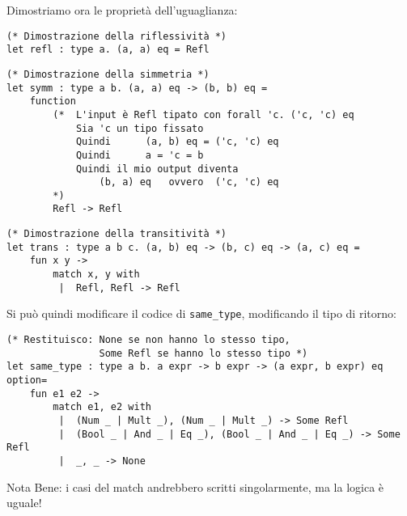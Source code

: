 \documentclass{article}
\begin{document}
Dimostriamo ora le proprietà dell'uguaglianza:
\begin{tcolorbox}
\begin{verbatim}
(* Dimostrazione della riflessività *)
let refl : type a. (a, a) eq = Refl
\end{verbatim}
\end{tcolorbox}
\begin{tcolorbox}
\begin{verbatim}
(* Dimostrazione della simmetria *)
let symm : type a b. (a, a) eq -> (b, b) eq =
    function 
        (*  L'input è Refl tipato con forall 'c. ('c, 'c) eq
            Sia 'c un tipo fissato
            Quindi      (a, b) eq = ('c, 'c) eq
            Quindi      a = 'c = b
            Quindi il mio output diventa
                (b, a) eq   ovvero  ('c, 'c) eq
        *)
        Refl -> Refl
\end{verbatim}
\end{tcolorbox}
\begin{tcolorbox}
\begin{verbatim}
(* Dimostrazione della transitività *)
let trans : type a b c. (a, b) eq -> (b, c) eq -> (a, c) eq = 
    fun x y ->
        match x, y with
         |  Refl, Refl -> Refl
\end{verbatim}
\end{tcolorbox}
\vspace{8pt}
Si può quindi modificare il codice di \texttt{same\_type}, modificando il tipo di ritorno:
\begin{tcolorbox}
\begin{verbatim}
(* Restituisco: None se non hanno lo stesso tipo, 
                Some Refl se hanno lo stesso tipo *)
let same_type : type a b. a expr -> b expr -> (a expr, b expr) eq option= 
    fun e1 e2 ->
        match e1, e2 with
         |  (Num _ | Mult _), (Num _ | Mult _) -> Some Refl
         |  (Bool _ | And _ | Eq _), (Bool _ | And _ | Eq _) -> Some Refl
         |  _, _ -> None
\end{verbatim}
\end{tcolorbox}
Nota Bene: i casi del match andrebbero scritti singolarmente, ma la logica è uguale!\vspace{8pt}
\end{document}
